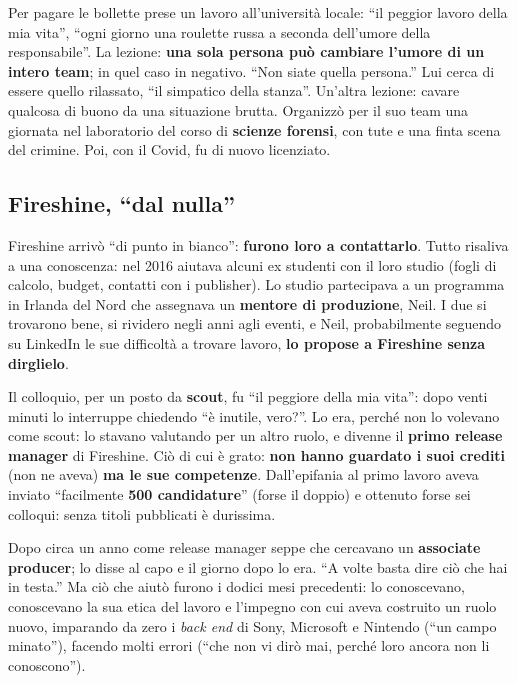 Per pagare le bollette prese un lavoro all'università locale: ``il peggior lavoro
della mia vita'', ``ogni giorno una roulette russa a seconda dell'umore della
responsabile''. La lezione: \textbf{una sola persona può cambiare l'umore di un
intero team}; in quel caso in negativo. ``Non siate quella persona.'' Lui cerca di
essere quello rilassato, ``il simpatico della stanza''. Un'altra lezione: cavare
qualcosa di buono da una situazione brutta. Organizzò per il suo team una giornata
nel laboratorio del corso di \textbf{scienze forensi}, con tute e una finta scena
del crimine. Poi, con il Covid, fu di nuovo licenziato.

\subsection{Fireshine, ``dal nulla''}

Fireshine arrivò ``di punto in bianco'': \textbf{furono loro a contattarlo}. Tutto
risaliva a una conoscenza: nel 2016 aiutava alcuni ex studenti con il loro studio
(fogli di calcolo, budget, contatti con i publisher). Lo studio partecipava a un
programma in Irlanda del Nord che assegnava un \textbf{mentore di produzione},
Neil. I due si trovarono bene, si rividero negli anni agli eventi, e Neil,
probabilmente seguendo su LinkedIn le sue difficoltà a trovare lavoro, \textbf{lo
propose a Fireshine senza dirglielo}.

Il colloquio, per un posto da \textbf{scout}, fu ``il peggiore della mia vita'':
dopo venti minuti lo interruppe chiedendo ``è inutile, vero?''. Lo era, perché non
lo volevano come scout: lo stavano valutando per un altro ruolo, e divenne il
\textbf{primo release manager} di Fireshine. Ciò di cui è grato: \textbf{non hanno
guardato i suoi crediti} (non ne aveva) \textbf{ma le sue competenze}. Dall'epifania
al primo lavoro aveva inviato ``facilmente \textbf{500 candidature}'' (forse il
doppio) e ottenuto forse sei colloqui: senza titoli pubblicati è durissima.

Dopo circa un anno come release manager seppe che cercavano un \textbf{associate
producer}; lo disse al capo e il giorno dopo lo era. ``A volte basta dire ciò che
hai in testa.'' Ma ciò che aiutò furono i dodici mesi precedenti: lo conoscevano,
conoscevano la sua etica del lavoro e l'impegno con cui aveva costruito un ruolo
nuovo, imparando da zero i \emph{back end} di Sony, Microsoft e Nintendo (``un
campo minato''), facendo molti errori (``che non vi dirò mai, perché loro ancora
non li conoscono'').

